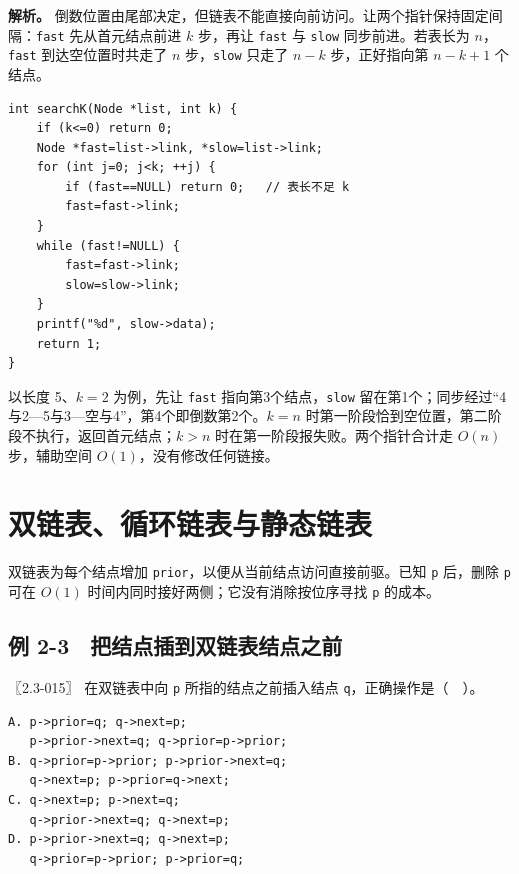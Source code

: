 
\textbf{解析。} 倒数位置由尾部决定，但链表不能直接向前访问。让两个指针保持固定间隔：\allowbreak{}\texttt{fast} 先从首元结点前进 \(k\) 步，再让 \allowbreak{}\texttt{fast} 与 \allowbreak{}\texttt{slow} 同步前进。若表长为 \(n\)，\allowbreak{}\texttt{fast} 到达空位置时共走了 \(n\) 步，\allowbreak{}\texttt{slow} 只走了 \(n-k\) 步，正好指向第 \(n-k+1\) 个结点。

\par\medskip\noindent
\begin{minipage}{\linewidth}
\begin{verbatim}
int searchK(Node *list, int k) {
    if (k<=0) return 0;
    Node *fast=list->link, *slow=list->link;
    for (int j=0; j<k; ++j) {
        if (fast==NULL) return 0;   // 表长不足 k
        fast=fast->link;
    }
    while (fast!=NULL) {
        fast=fast->link;
        slow=slow->link;
    }
    printf("%d", slow->data);
    return 1;
}
\end{verbatim}
\end{minipage}\par\medskip

以长度 5、\(k=2\) 为例，先让 \allowbreak{}\texttt{fast} 指向第3个结点，\allowbreak{}\texttt{slow} 留在第1个；同步经过``4与2---5与3---空与4''，第4个即倒数第2个。\(k=n\) 时第一阶段恰到空位置，第二阶段不执行，返回首元结点；\(k>n\) 时在第一阶段报失败。两个指针合计走 \(O(n)\) 步，辅助空间 \(O(1)\)，没有修改任何链接。

\section{双链表、循环链表与静态链表}\label{ds-02-04}

双链表为每个结点增加 \allowbreak{}\texttt{prior}，以便从当前结点访问直接前驱。已知 \allowbreak{}\texttt{p} 后，删除 \allowbreak{}\texttt{p} 可在 \(O(1)\) 时间内同时接好两侧；它没有消除按位序寻找 \allowbreak{}\texttt{p} 的成本。

\subsection{例 2-3　把结点插到双链表结点之前}\label{ds-ex2-3}

\noindent{}〖2.3-015〗 在双链表中向 \allowbreak{}\texttt{p} 所指的结点之前插入结点 \allowbreak{}\texttt{q}，正确操作是（　）。

\par\medskip\noindent
\begin{minipage}{\linewidth}
\begin{verbatim}
A. p->prior=q; q->next=p;
   p->prior->next=q; q->prior=p->prior;
B. q->prior=p->prior; p->prior->next=q;
   q->next=p; p->prior=q->next;
C. q->next=p; p->next=q;
   q->prior->next=q; q->next=p;
D. p->prior->next=q; q->next=p;
   q->prior=p->prior; p->prior=q;
\end{verbatim}
\end{minipage}\par\medskip

